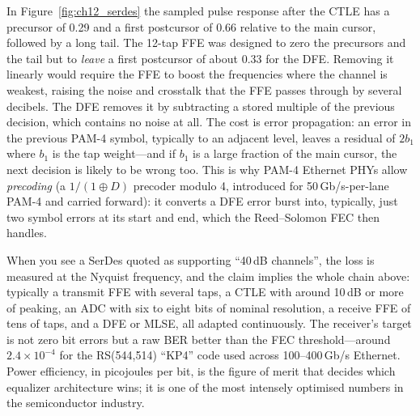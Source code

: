 \begin{worked}
In Figure~\ref{fig:ch12_serdes} the sampled pulse response after the CTLE has a precursor of 0.29
and a first postcursor of 0.66 relative to the main cursor, followed by a long tail. The 12-tap FFE
was designed to zero the precursors and the tail but to \emph{leave} a first postcursor of about 0.33
for the DFE. Removing it linearly would require the FFE to boost the frequencies where the channel is
weakest, raising the noise and crosstalk that the FFE passes through by several decibels. The DFE removes
it by subtracting a stored multiple of the previous decision, which contains no noise at all. The cost
is error propagation: an error in the previous PAM-4 symbol, typically to an adjacent level, leaves a
residual of $2b_1$ where $b_1$ is the tap weight---and if $b_1$ is a large fraction of the main
cursor, the next decision is likely to be wrong too. This is why PAM-4 Ethernet PHYs allow
\emph{precoding} (a $1/(1\oplus D)$ precoder modulo 4, introduced for 50\,Gb/s-per-lane PAM-4 and carried
forward): it converts a DFE error burst into, typically, just two symbol errors at its start and
end, which the Reed--Solomon FEC then handles.
\end{worked}


\begin{inpractice}
When you see a SerDes quoted as supporting ``40\,dB channels'', the loss is measured at the Nyquist
frequency, and the claim implies the whole chain above: typically a transmit FFE with several taps,
a CTLE with around 10\,dB or more of peaking, an ADC with six to eight bits of nominal resolution, a receive FFE of
tens of taps, and a DFE or MLSE, all adapted continuously. The receiver's target is not zero bit
errors but a raw BER better than the FEC threshold---around $2.4\times10^{-4}$ for the RS(544,514) ``KP4''
code used across 100--400\,Gb/s Ethernet. Power efficiency, in picojoules per bit, is the figure of
merit that decides which equalizer architecture wins; it is one of the most intensely optimised
numbers in the semiconductor industry.
\end{inpractice}

